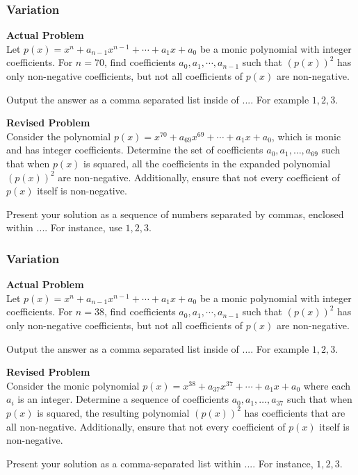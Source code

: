 \subsubsection{Variation}
\textbf{Actual Problem}\\
Let $p(x) = x^n + a_{n-1}x^{n-1} + \cdots + a_1x + a_0$ be a monic polynomial with integer coefficients.
For $n = 70$, find coefficients $a_0, a_1, \cdots, a_{n-1}$ such that $(p(x))^2$ has only non-negative coefficients, but not all coefficients of $p(x)$ are non-negative.

Output the answer as a comma separated list inside of $\boxed{...}$. For example $\boxed{1, 2, 3}$.

\textbf{Revised Problem}\\
Consider the polynomial $p(x) = x^{70} + a_{69}x^{69} + \cdots + a_1x + a_0$, which is monic and has integer coefficients. Determine the set of coefficients $a_0, a_1, \ldots, a_{69}$ such that when $p(x)$ is squared, all the coefficients in the expanded polynomial $(p(x))^2$ are non-negative. Additionally, ensure that not every coefficient of $p(x)$ itself is non-negative.

Present your solution as a sequence of numbers separated by commas, enclosed within $\boxed{...}$. For instance, use $\boxed{1, 2, 3}$.

\subsubsection{Variation}
\textbf{Actual Problem}\\
Let $p(x) = x^n + a_{n-1}x^{n-1} + \cdots + a_1x + a_0$ be a monic polynomial with integer coefficients.
For $n = 38$, find coefficients $a_0, a_1, \cdots, a_{n-1}$ such that $(p(x))^2$ has only non-negative coefficients, but not all coefficients of $p(x)$ are non-negative.

Output the answer as a comma separated list inside of $\boxed{...}$. For example $\boxed{1, 2, 3}$.

\textbf{Revised Problem}\\
Consider the monic polynomial $p(x) = x^{38} + a_{37}x^{37} + \cdots + a_1x + a_0$ where each $a_i$ is an integer. Determine a sequence of coefficients $a_0, a_1, \ldots, a_{37}$ such that when $p(x)$ is squared, the resulting polynomial $(p(x))^2$ has coefficients that are all non-negative. Additionally, ensure that not every coefficient of $p(x)$ itself is non-negative.

Present your solution as a comma-separated list within $\boxed{...}$. For instance, $\boxed{1, 2, 3}$.

